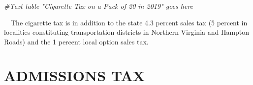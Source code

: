 \documentclass[
]{book}
\newenvironment{Shaded}{\begin{snugshade}}{\end{snugshade}}
\newcommand{\CommentTok}[1]{\textcolor[rgb]{0.56,0.35,0.01}{\textit{#1}}}
\begin{document}
\begin{Shaded}
\begin{Highlighting}[]
\CommentTok{\#Text table "Cigarette Tax on a Pack of 20 in 2019" goes here}
\end{Highlighting}
\end{Shaded}

\hfill\break
~~The cigarette tax is in addition to the state 4.3 percent sales tax (5 percent in localities constituting transportation districts in Northern Virginia and Hampton Roads) and the 1 percent local option sales tax.\\

\hypertarget{admissions-tax}{%
\section{ADMISSIONS TAX}\label{admissions-tax}}
\end{document}
